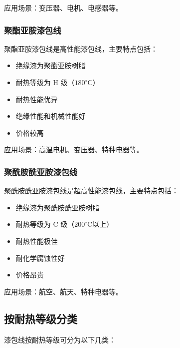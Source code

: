 \documentclass[12pt,UTF8]{ctexbook}
\begin{document}
应用场景：变压器、电机、电感器等。

\subsubsection{聚酯亚胺漆包线}

聚酯亚胺漆包线是高性能漆包线，主要特点包括：

\begin{itemize}[leftmargin=2cm]
    \item 绝缘漆为聚酯亚胺树脂
    \item 耐热等级为 H 级（$180^\circ$C）
    \item 耐热性能优异
    \item 绝缘性能和机械性能好
    \item 价格较高
\end{itemize}

应用场景：高温电机、变压器、特种电器等。

\subsubsection{聚酰胺酰亚胺漆包线}

聚酰胺酰亚胺漆包线是超高性能漆包线，主要特点包括：

\begin{itemize}[leftmargin=2cm]
    \item 绝缘漆为聚酰胺酰亚胺树脂
    \item 耐热等级为 C 级（$200^\circ$C以上）
    \item 耐热性能极佳
    \item 耐化学腐蚀性好
    \item 价格昂贵
\end{itemize}

应用场景：航空、航天、特种电器等。

\subsection{按耐热等级分类}

漆包线按耐热等级可分为以下几类：
\end{document}
